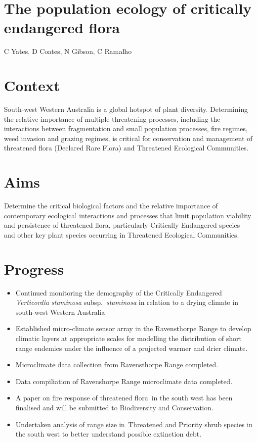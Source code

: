 \documentclass[version=last,
    paper=a4, %
    10pt, %
    usenames,
    dvipsnames,
    oneside, %
    headings=openany, %
    DIV=15 %
]{scrbook}
\begin{document}
\section*{The population ecology of critically endangered flora
}

C Yates, D Coates, N Gibson, C Ramalho


\section*{Context}
South-west Western Australia is a global hotspot of plant diversity.
Determining the relative importance of multiple threatening processes,
including the interactions between fragmentation and small population
processes, fire regimes, weed invasion and grazing regimes, is critical
for conservation and management of threatened flora (Declared Rare
Flora) and Threatened Ecological Communities.



\section*{Aims}
Determine the critical biological factors and the relative importance of
contemporary ecological interactions and processes that limit population
viability and persistence of threatened flora, particularly Critically
Endangered species and other key plant species occurring in Threatened
Ecological Communities.



\section*{Progress}
\begin{itemize}
\itemsep1pt\parskip0pt
\item
  Continued monitoring the demography of the Critically Endangered
  \emph{Verticordia} \emph{staminosa} subsp.~\emph{staminosa} in
  relation to a drying climate in south-west Western Australia
\item
  Established micro-climate sensor array in the Ravensthorpe Range to
  develop climatic layers at appropriate scales for modelling the
  distribution of short range endemics under the influence of a
  projected warmer and drier climate.
\item
  Microclimate data collection from Ravensthorpe Range completed.
\item
  Data compiliation of Ravenshorpe Range microclimate data completed.
\item
  A paper on fire response of threatened flora~in the south west has
  been finalised and will be submitted to Biodiversity and Conservation.
\item
  Undertaken analysis of range size in~Threatened and Priority shrub
  species in the south west to better understand possible extinction
  debt.
\end{itemize}
\end{document}
